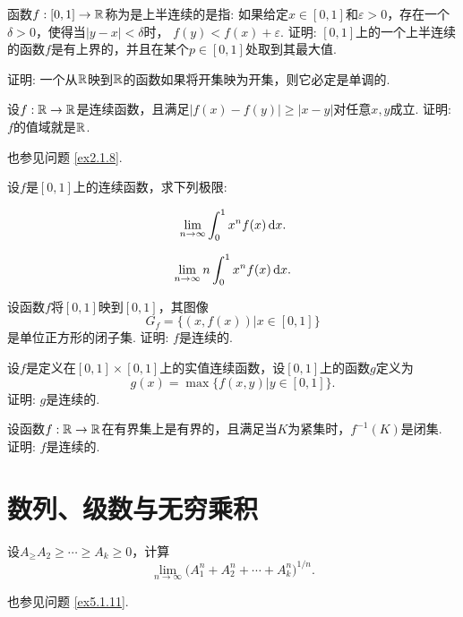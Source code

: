 \begin{example}
  函数$f:[0,1]\to\mathbb R$称为是上半连续的是指: 如果给定$x\in[0,1]$和$\varepsilon>0$，存在一个$\delta>0$，使得当$|y-x|<\delta$时， $f(y)<f(x)+\varepsilon$. 证明: $[0,1]$上的一个上半连续的函数$f$是有上界的，并且在某个$p\in[0,1]$处取到其最大值.
\end{example}

\begin{example}
  证明: 一个从$\mathbb R$映到$\mathbb R$的函数如果将开集映为开集，则它必定是单调的.
\end{example}

\begin{example}
  设$f:\mathbb R\to\mathbb R$是连续函数，且满足$|f(x)-f(y)|\ge|x-y|$对任意$x,y$成立. 证明: $f$的值域就是$\mathbb R$.
\end{example}
\begin{note}
  也参见问题 \ref{ex2.1.8}.
\end{note}

\begin{example}
  设$f$是$[0,1]$上的连续函数，求下列极限:
  \begin{eenum}
    \item
    \[ \lim_{n\to\infty}\int_0^1x^nf(x)\,\dx. \]
    \item
    \[ \lim_{n\to\infty}n\int_0^1x^nf(x)\,\dx. \]
  \end{eenum}
\end{example}

\begin{example}
  设函数$f$将$[0,1]$映到$[0,1]$，其图像
  \[ G_f=\{(x,f(x))|x\in[0,1]\} \]
  是单位正方形的闭子集. 证明: $f$是连续的.
\end{example}

\begin{example}
  设$f$是定义在$[0,1]\times[0,1]$上的实值连续函数，设$[0,1]$上的函数$g$定义为
  \[ g(x)=\max\{f(x,y)|y\in[0,1]\}. \]
  证明: $g$是连续的.
\end{example}

\begin{example}
  设函数$f:\mathbb R\to\mathbb R$在有界集上是有界的，且满足当$K$为紧集时，$f^{-1}(K)$是闭集. 证明: $f$是连续的.
\end{example}

\section{数列、级数与无穷乘积}
\begin{example}
  设$A_\ge A_2\ge\cdots\ge A_k\ge0$，计算
  \[ \lim_{n\to\infty}\big(
   A_1^n+A_2^n+\cdots+A_k^n
  \big)^{1/n}. \]
\end{example}
\begin{note}
  也参见问题 \ref{ex5.1.11}.
\end{note}

